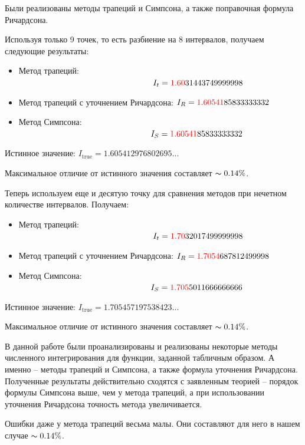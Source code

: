 		Были реализованы методы трапеций и Симпсона, а также поправочная формула Ричардсона.
		
		
		Используя только 9 точек, то есть разбиение на 8 интервалов, получаем следующие результаты:
		\begin{itemize}
			\item Метод трапеций: $\hspace{57mm} I_t = \textcolor{red}{1.60}31443749999998$
			
			\item Метод трапеций с уточнением Ричардсона: $I_R = \textcolor{red}{1.60541}85833333332$
			
			\item Метод Симпсона: $\hspace{56mm}  I_S = \textcolor{red}{1.60541}85833333332$
		\end{itemize}
		
		Истинное значение: $I_\text{true} = 1.605412976802695...$

		Максимальное отличие от истинного значения составляет $\thicksim 0.14 \%$.	
	
		\newpage
		Теперь используем еще и десятую точку для сравнения методов при нечетном количестве интервалов. Получаем:
		\begin{itemize}
			\item Метод трапеций: $\hspace{57mm} I_t = \textcolor{red}{1.70}32017499999998$
			
			\item Метод трапеций с уточнением Ричардсона: $I_R = \textcolor{red}{1.7054}687812499998$
			
			\item Метод Симпсона: $\hspace{56mm}  I_S = \textcolor{red}{1.705}5011666666666$
		\end{itemize}

		Истинное значение: $I_\text{true} = 1.705457197538423...$
		
		Максимальное отличие от истинного значения составляет $\thicksim 0.14 \%$.	
		
		\newpage
		В данной работе были проанализированы и реализованы некоторые методы численного интегрирования для функции, заданной табличным образом. А именно -- методы трапеций и Симпсона, а также формула уточнения Ричардсона. Полученные результаты действительно сходятся с заявленным теорией -- порядок формулы Симпсона выше, чем у метода трапеций, а при использовании уточнения Ричардсона точность метода увеличивается. 
		
		Ошибки даже у метода трапеций весьма малы. Они составляют для него в нашем случае $\thicksim 0.14 \%$.
